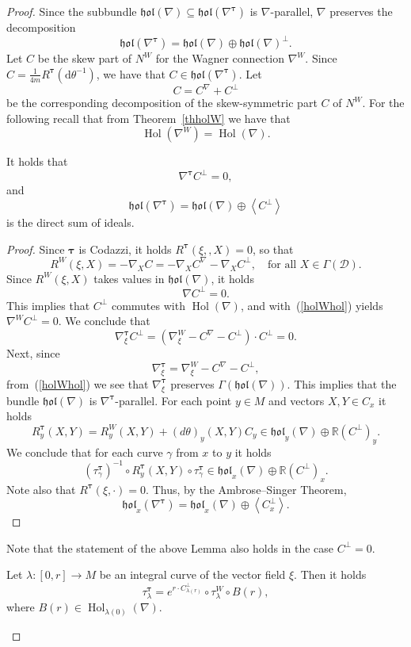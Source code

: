 \documentclass[10pt,a4paper]{amsart}
\newcommand{\D}{{\mathcal D}}
\newcommand{\Hol}{\operatorname{Hol}}
\newcommand{\Real}{\mathbb{R}}
\newcommand{\bt}{{\boldsymbol{\tau}}}
\renewcommand{\d}{\mathrm{d}}
\newcommand{\hol}{\mathfrak{hol}}
\begin{document}
\begin{proof}  Since the subbundle $\hol(\nabla)\subseteq\hol(\nabla^\bt)$ is $\nabla$-parallel,   $\nabla$ preserves the decomposition
$$
\hol(\nabla^\bt)=\hol(\nabla) \oplus \hol(\nabla)^\bot.$$ 
Let $C$ be the skew part of $N^W$ for the Wagner connection $\nabla^W$.  Since $C=\tfrac{1}{4m} R^\bt(\d \theta^{-1})$, we have that $C\in \hol(\nabla^\bt) $. Let $$C=C^\nabla+C^\bot$$ be the corresponding decomposition of the skew-symmetric part $C$ of $N^W$.
For the following recall that from Theorem~\ref{thholW} we have that  \begin{equation}
\label{holWhol}\Hol(\nabla^W)=\Hol(\nabla).\end{equation}


\begin{lem} It holds that $$\nabla^\bt C^\bot=0,$$ and
	$$\hol(\nabla^\bt)=\hol(\nabla) \oplus \left<C^\bot\right>  $$ is the direct sum of ideals.
\end{lem}

\begin{proof}  Since $\bt$ is Codazzi, it holds $R^\bt(\xi,,X)=0$, so that 
$$R^W(\xi,X)=-\nabla_XC=-\nabla_XC^\nabla-\nabla_XC^\bot,\quad\text{for all } X\in\Gamma(\D).$$
Since $R^W(\xi,X)$ takes values in $\hol(\nabla)$, it holds 
$$\nabla C^\bot=0.$$ This implies that $ C^\perp$ commutes with $\Hol(\nabla)$, and with~(\ref{holWhol})  yields  $\nabla^W C^\bot=0$.
We conclude that
$$\nabla^\bt_\xi C^\bot=(\nabla^W_\xi-C^\nabla-C^\bot)\cdot C^\bot=0.$$
Next, since
$$\nabla^\bt_\xi =\nabla^W_\xi-C^\nabla-C^\bot,$$
from~(\ref{holWhol}) we see that $\nabla^\bt_\xi$ preserves $\Gamma(\hol(\nabla))$. This implies that the bundle $\hol(\nabla)$ is $\nabla^\bt$-parallel.
For each point $y\in M$ and vectors $X,Y\in C_x$ it holds 
$$R^\bt_y(X,Y)=R^W_y(X,Y)+(d\theta)_y(X,Y)C_y\in\hol_y(\nabla)\oplus\Real (C^\bot)_y.$$
We conclude that for each curve $\gamma$ from $x$ to $y$ it holds
$$(\tau^\bt_\gamma)^{-1}\circ R^\bt_y(X,Y)\circ\tau^\bt_\gamma\in  \hol_x(\nabla)\oplus\Real (C^\bot)_x.$$ Note also that $R^\bt(\xi,\cdot)=0.$
Thus, by the Ambrose--Singer Theorem, 
$$\hol_x(\nabla^\bt)=\hol_x(\nabla) \oplus \left<C_x^\bot\right>.$$ \end{proof}

Note that the statement of the above Lemma also holds  in the case $C^\bot=0$.

\begin{lem}\label{lemxi1} Let $\lambda:[0,r]\to M$ be an integral curve of the vector field $\xi$. Then it holds
	$$\tau_\lambda^\bt=e^{r\cdot C^\bot_{\lambda(r)}}\circ \tau_\lambda^W\circ B(r),$$ where $B(r)\in\Hol_{\lambda(0)}(\nabla)$.
\end{lem}


\end{proof}
\end{document}
